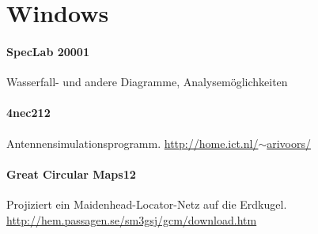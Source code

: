 \section{Windows}
\paragraph{SpecLab 20001} Wasserfall- und andere Diagramme, Analysemöglichkeiten

\paragraph{4nec212} Antennensimulationsprogramm. \href{http://home.ict.nl/$\sim$arivoors/}{http://home.ict.nl/$\sim$arivoors/}

\paragraph{Great Circular Maps12} Projiziert ein Maidenhead-Locator-Netz auf die Erdkugel. \href{http://hem.passagen.se/sm3gsj/gcm/download.htm}{http://hem.passagen.se/sm3gsj/gcm/download.htm}